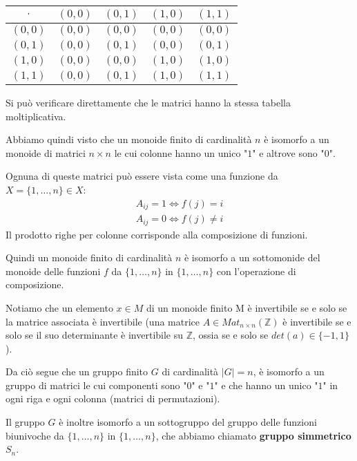 \documentclass[../main.tex]{subfiles}
\begin{document}
\begin{example}
    \vspace*{1em}
    \begin{center}
        \begin{tabular}{c|c|c|c|c}
            $\cdot$ & $(0,0)$ & $(0,1)$ & $(1,0)$ & $(1,1)$ \\ \hline
            $(0,0)$ & $(0,0)$ & $(0,0)$ & $(0,0)$ & $(0,0)$ \\ \hline
            $(0,1)$ & $(0,0)$ & $(0,1)$ & $(0,0)$ & $(0,1)$ \\ \hline
            $(1,0)$ & $(0,0)$ & $(0,0)$ & $(1,0)$ & $(1,0)$ \\ \hline
            $(1,1)$ & $(0,0)$ & $(0,1)$ & $(1,0)$ & $(1,1)$ \\
        \end{tabular}
    \end{center}
    \vspace*{1em}
    Si può verificare direttamente che le matrici hanno la stessa tabella moltiplicativa.
\end{example}

Abbiamo quindi visto che un monoide finito di cardinalità $n$ è isomorfo a un monoide di matrici $n \times n$ le cui colonne hanno un unico "$1$" e altrove sono "$0$".

Ognuna di queste matrici può essere vista come una funzione da $X = \{1,\ldots,n\} \in X$:
\begin{gather*}
    A_{ij} = 1 \iff f(j) = i\\
    A_{ij} = 0 \iff f(j) \neq i
\end{gather*}
Il prodotto righe per colonne corrisponde alla composizione di funzioni.

Quindi un monoide finito di cardinalità $n$ è isomorfo a un sottomonide del monoide delle funzioni $f$ da $\{1,\ldots,n\}$ in $\{1,\ldots,n\}$ con l'operazione di composizione.

Notiamo che un elemento $x \in M$ di un monoide finito M è invertibile se e solo se la matrice associata è invertibile (una matrice $A \in Mat_{n \times n} (\mathbb{Z})$ è invertibile se e solo se il suo determinante è invertibile su $\mathbb{Z}$, ossia se e solo se $det(a) \in \{-1,1\}$).

Da ciò segue che un gruppo finito $G$ di cardinalità $|G|=n$, è isomorfo a un gruppo di matrici le cui componenti sono "$0$" e "$1$" e che hanno un unico "$1$" in ogni riga e ogni colonna (matrici di permutazioni).

Il gruppo $G$ è inoltre isomorfo a un sottogruppo del gruppo delle funzioni biunivoche da $\{1,\ldots,n\}$ in $\{1,\ldots,n\}$, che abbiamo chiamato \textbf{gruppo simmetrico $S_n$}.
\end{document}
